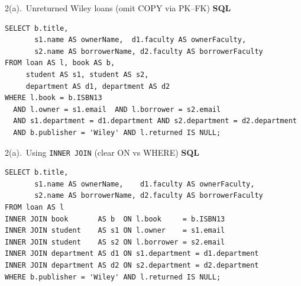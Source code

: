 \documentclass{beamer}
\begin{document}
\begin{frame}[fragile]{2(a).\ Unreturned Wiley loans (omit COPY via PK–FK)}
\small
\textbf{SQL}
\begin{lstlisting}[style=sqlcompact]
SELECT b.title,
       s1.name AS ownerName,  d1.faculty AS ownerFaculty,
       s2.name AS borrowerName, d2.faculty AS borrowerFaculty
FROM loan AS l, book AS b,
     student AS s1, student AS s2,
     department AS d1, department AS d2
WHERE l.book = b.ISBN13
  AND l.owner = s1.email  AND l.borrower = s2.email
  AND s1.department = d1.department AND s2.department = d2.department
  AND b.publisher = 'Wiley' AND l.returned IS NULL;
\end{lstlisting}

\end{frame}

\begin{frame}[fragile]{2(a).\ Using \texttt{INNER JOIN} (clear ON vs WHERE)}
\small
\textbf{SQL}
\begin{lstlisting}[style=sqlcompact]
SELECT b.title,
       s1.name AS ownerName,    d1.faculty AS ownerFaculty,
       s2.name AS borrowerName, d2.faculty AS borrowerFaculty
FROM loan AS l
INNER JOIN book       AS b  ON l.book     = b.ISBN13
INNER JOIN student    AS s1 ON l.owner    = s1.email
INNER JOIN student    AS s2 ON l.borrower = s2.email
INNER JOIN department AS d1 ON s1.department = d1.department
INNER JOIN department AS d2 ON s2.department = d2.department
WHERE b.publisher = 'Wiley' AND l.returned IS NULL;
\end{lstlisting}

\end{frame}
\end{document}
